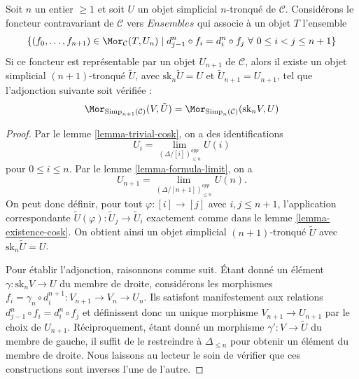 \begin{lemma}
\label{lemma-work-out}
Soit $n$ un entier $\geq 1$ et soit $U$ un objet simplicial $n$-tronqué
de $\mathcal{C}$. Considérons le foncteur contravariant de $\mathcal{C}$
vers $\textit{Ensembles}$ qui associe à un objet $T$ l'ensemble
$$
\{ (f_0, \ldots, f_{n + 1}) \in \Mor_\mathcal{C}(T, U_n)
\mid
d^n_{j - 1} \circ f_i = d^n_i \circ f_j
\ \forall\ 0\leq i < j\leq n + 1\}
$$
Si ce foncteur est représentable par un objet $U_{n + 1}$ de
$\mathcal{C}$, alors il existe un objet simplicial $(n + 1)$-tronqué
$\tilde U$, avec $\text{sk}_n \tilde U = U$ et
$\tilde U_{n + 1} = U_{n + 1}$, tel que l'adjonction suivante soit vérifiée :
$$
\Mor_{\text{Simp}_{n + 1}(\mathcal{C})}(V, \tilde U)
=
\Mor_{\text{Simp}_n(\mathcal{C})}(\text{sk}_nV, U)
$$
\end{lemma}

\begin{proof}
Par le lemme \ref{lemma-trivial-cosk}, on a des identifications
$$
U_i = \lim_{(\Delta/[i])_{\leq n}^{opp}} U(i)
$$
pour $0 \leq i \leq n$. Par le lemme \ref{lemma-formula-limit}, on a
$$
U_{n + 1} = \lim_{(\Delta/[n + 1])_{\leq n}^{opp}} U(n).
$$
On peut donc définir, pour tout $\varphi : [i] \to [j]$ avec
$i, j \leq n + 1$, l'application correspondante
$\tilde U(\varphi) : \tilde U_j \to \tilde U_i$ exactement comme dans le
lemme \ref{lemma-existence-cosk}. On obtient ainsi un objet simplicial
$(n + 1)$-tronqué $\tilde U$ avec $\text{sk}_n \tilde U = U$.

\medskip\noindent
Pour établir l'adjonction, raisonnons comme suit. Étant donné un élément
$\gamma : \text{sk}_n V \to U$ du membre de droite, considérons les morphismes
$f_i = \gamma_n \circ d^{n + 1}_i : V_{n + 1} \to V_n \to U_n$.
Ils satisfont manifestement aux relations
$d^n_{j - 1} \circ f_i = d^n_i \circ f_j$ et définissent donc un unique
morphisme $V_{n + 1} \to U_{n + 1}$ par le choix de $U_{n + 1}$.
Réciproquement, étant donné un morphisme $\gamma' : V \to \tilde U$ du
membre de gauche, il suffit de le restreindre à $\Delta_{\leq n}$ pour
obtenir un élément du membre de droite. Nous laissons au lecteur le soin
de vérifier que ces constructions sont inverses l'une de l'autre.
\end{proof}

